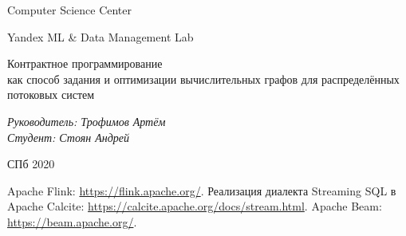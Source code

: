 \documentclass[a4paper,12pt]{article}
\begin{document}
\thispagestyle{empty}
\begin{center}
    Computer Science Center

    Yandex ML \& Data Management Lab
\end{center}
\vspace{13ex}

\begin{center}
    \vspace{16ex}
    \begin{spacing}{1.5}
        {\Large Контрактное программирование \\как способ задания и оптимизации вычислительных графов для распределённых потоковых систем}
    \end{spacing}
\end{center}
\vfill
\begin{flushright}
    \noindent
    \textit{Руководитель: Трофимов Артём} \\
    \textit{Студент: Стоян Андрей}
\end{flushright}
\vspace{5ex}
\begin{center}
    СПб 2020
\end{center}
\newpage

\tableofcontents
\newpage


\newpage

\newpage

\newpage








\begin{thebibliography}{9}  %
     Apache Flink: \url{https://flink.apache.org/}.
     Реализация диалекта Streaming SQL в Apache Calcite: \url{https://calcite.apache.org/docs/stream.html}.
     Apache Beam: \url{https://beam.apache.org/}.
\end{thebibliography}
\end{document}
